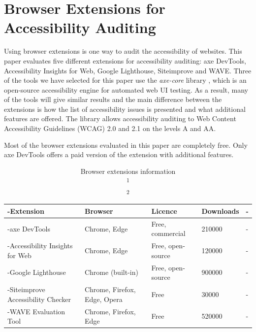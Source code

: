 \chapter{Browser Extensions for Accessibility Auditing}

\label{chap:Intro}

Using browser extensions is one way to audit the accessibility of websites.
This paper evaluates five different extensions for accessibility auditing: axe DevTools, Accessibility Insights for Web, Google Lighthouse, Siteimprove and WAVE.
Three of the tools we have selected for this paper use the \emph{axe-core} library \parencite{axe_core}, which is an open-source accessibility engine for automated web UI testing.
As a result, many of the tools will give similar results and the main difference between the extensions is how the list of accessibility issues is presented and what additional features are offered.
The library allows accessibility auditing to Web Content Accessibility Guidelines (WCAG) 2.0 and 2.1 on the levels A and AA.

Most of the browser extensions evaluated in this paper are completely free.
Only axe DevTools offers a paid version of the extension with additional features.

\begin{table}[h]
\tablestretch
{}
\centering
\begin{tabularx}{\linewidth}
{>{\kern-\tabcolsep}lllXX<{\kern-\tabcolsep}}
\toprule
\textbf{Extension} & \textbf{Browser} & \textbf{Licence} & \textbf{Downloads\footnotemark}
\\
\midrule
axe DevTools & Chrome, Edge & Free, commercial & 210000 \\
%
Accessibility Insights for Web & Chrome, Edge & Free, open-source & 120000 \\
%
Google Lighthouse & Chrome (built-in) & Free, open-source & 900000\footnotemark \\
%
Siteimprove Accessibility Checker & Chrome, Firefox, Edge, Opera & Free & 30000 \\
%
WAVE Evaluation Tool & Chrome, Firefox, Edge & Free & 520000 \\
\bottomrule
\end{tabularx}
\caption[Browser Extensions Information]
{
Browser extensions information \\
\textsuperscript{1} \\
\textsuperscript{2}
}
\label{tab:browser-extensions-info}
\end{table}

